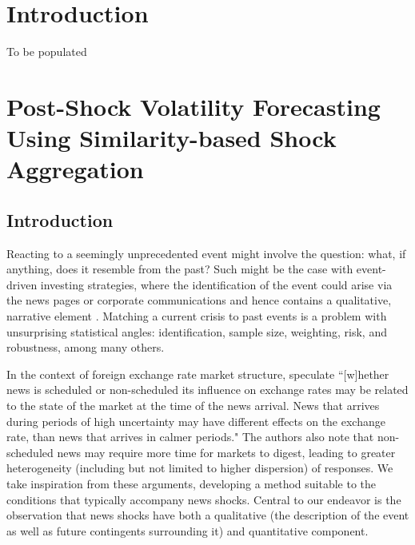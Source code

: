 \documentclass{uiucthesis2021}
\theoremstyle{definition}
\begin{document}
\mainmatter

\chapter{Introduction}

To be populated

\chapter{Post-Shock Volatility Forecasting Using Similarity-based Shock Aggregation}

\section{Introduction}

Reacting to a seemingly unprecedented event might involve the question: what, if anything, does it resemble from the past?  Such might be the case with event-driven investing strategies, where the identification of the event could arise via the news pages or corporate communications and hence contains a qualitative, narrative element \citep{Kenton}.  Matching a current crisis to past events is a problem with unsurprising statistical angles: identification, sample size, weighting, risk, and robustness, among many others.  

In the context of foreign exchange rate market structure, \citet{dominguez2006defines} speculate ``[w]hether news is scheduled or non-scheduled its influence on exchange rates may be related to the state of the market at the time of the news arrival.  News that arrives during periods of high uncertainty may have different effects on the exchange rate, than news that arrives in calmer periods." The authors also note that non-scheduled news may require more time for markets to digest, leading to greater heterogeneity (including but not limited to higher dispersion) of responses.  We take inspiration from these arguments, developing a method suitable to the conditions that typically accompany news shocks.  Central to our endeavor is the observation that news shocks have both a qualitative (the description of the event as well as future contingents surrounding it) and quantitative component.%
\end{document}
